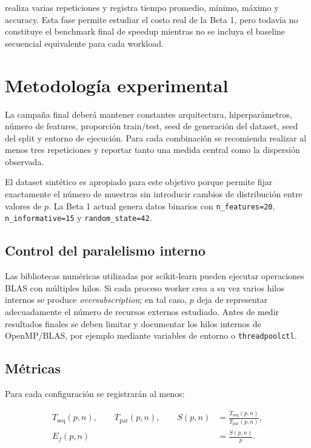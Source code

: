 \documentclass[11pt,a4paper]{article}
\newcommand{\Speedup}{S}
\newcommand{\Efficiency}{E_f}
\begin{document}
realiza varias repeticiones y registra tiempo promedio, mínimo, máximo y accuracy. Esta
fase permite estudiar el costo real de la Beta 1, pero todavía no constituye el benchmark
final de speedup mientras no se incluya el baseline secuencial equivalente para cada
workload.

\section{Metodología experimental}

La campaña final deberá mantener constantes arquitectura, hiperparámetros, número de
features, proporción train/test, seed de generación del dataset, seed del split y entorno
de ejecución. Para cada combinación se recomienda realizar al menos tres repeticiones y
reportar tanto una medida central como la dispersión observada.

El dataset sintético es apropiado para este objetivo porque permite fijar exactamente el
número de muestras sin introducir cambios de distribución entre valores de $p$. La Beta
1 actual genera datos binarios con \texttt{n\_features=20},
\texttt{n\_informative=15} y \texttt{random\_state=42}.

\subsection{Control del paralelismo interno}

Las bibliotecas numéricas utilizadas por scikit-learn pueden ejecutar operaciones BLAS
con múltiples hilos. Si cada proceso worker crea a su vez varios hilos internos se produce
\emph{oversubscription}; en tal caso, $p$ deja de representar adecuadamente el número de
recursos externos estudiado. Antes de medir resultados finales se deben limitar y
documentar los hilos internos de OpenMP/BLAS, por ejemplo mediante variables de entorno
o \texttt{threadpoolctl}.

\subsection{Métricas}

Para cada configuración se registrarán al menos:

\begin{align}
    T_{\mathrm{seq}}(p,n),\qquad
    T_{\mathrm{par}}(p,n),\qquad
    \Speedup(p,n)&=\frac{T_{\mathrm{seq}}(p,n)}{T_{\mathrm{par}}(p,n)},\\
    \Efficiency(p,n)&=\frac{\Speedup(p,n)}{p}.
\end{align}
\end{document}
